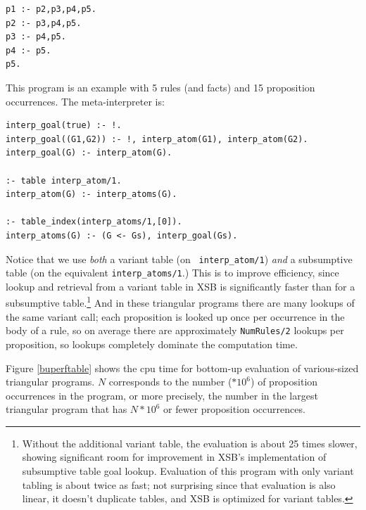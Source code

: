 \footnotesize
\begin{verbatim}
p1 :- p2,p3,p4,p5.
p2 :- p3,p4,p5.
p3 :- p4,p5.
p4 :- p5.
p5.
\end{verbatim}
\normalsize

This program is an example with 5 rules (and facts) and 15 proposition
occurrences.  The meta-interpreter is:

\footnotesize
\begin{verbatim}
interp_goal(true) :- !.
interp_goal((G1,G2)) :- !, interp_atom(G1), interp_atom(G2).
interp_goal(G) :- interp_atom(G).

:- table interp_atom/1.
interp_atom(G) :- interp_atoms(G).

:- table_index(interp_atoms/1,[0]).
interp_atoms(G) :- (G <- Gs), interp_goal(Gs).
\end{verbatim}
\normalsize

Notice that we use {\em both} a variant table (on {\tt
  interp\_atom/1}) {\em and} a subsumptive table (on the equivalent
{\tt interp\_atoms/1}.)  This is to improve efficiency, since lookup
and retrieval from a variant table in XSB is significantly faster than for a
subsumptive table.\footnote{Without the additional variant table, the
  evaluation is about 25 times slower, showing significant room for
  improvement in XSB's implementation of subsumptive table goal
  lookup.  Evaluation of this program with only variant tabling is
  about twice as fast; not surprising since that evaluation is also
  linear, it doesn't duplicate tables, and XSB is optimized for
  variant tables.  } And in these triangular programs there are many
lookups of the same variant call; each proposition is looked up once
per occurrence in the body of a rule, so on average there are
approximately {\tt NumRules/2} lookups per proposition, so lookups
completely dominate the computation time.

Figure \ref{buperftable} shows the cpu time for bottom-up evaluation
of various-sized triangular programs.  $N$ corresponds to the
number ($*10^6$) of proposition occurrences in the program, or more
precisely, the number in the largest triangular program that has
$N*10^6$ or fewer proposition occurrences.

